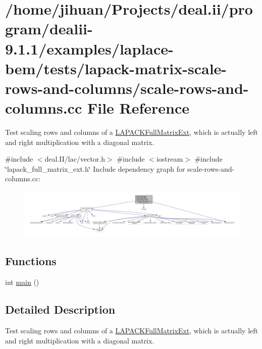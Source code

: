 \hypertarget{scale-rows-and-columns_8cc}{}\section{/home/jihuan/\+Projects/deal.ii/program/dealii-\/9.1.1/examples/laplace-\/bem/tests/lapack-\/matrix-\/scale-\/rows-\/and-\/columns/scale-\/rows-\/and-\/columns.cc File Reference}
\label{scale-rows-and-columns_8cc}


Test scaling rows and columns of a \hyperlink{classLAPACKFullMatrixExt}{L\+A\+P\+A\+C\+K\+Full\+Matrix\+Ext}, which is actually left and right multiplication with a diagonal matrix.  


{\ttfamily \#include $<$deal.\+I\+I/lac/vector.\+h$>$}\newline
{\ttfamily \#include $<$iostream$>$}\newline
{\ttfamily \#include \char`\"{}lapack\+\_\+full\+\_\+matrix\+\_\+ext.\+h\char`\"{}}\newline
Include dependency graph for scale-\/rows-\/and-\/columns.cc\+:
\nopagebreak
\begin{figure}[H]
\begin{center}
\leavevmode
\includegraphics[width=350pt]{scale-rows-and-columns_8cc__incl}
\end{center}
\end{figure}
\subsection*{Functions}
\begin{DoxyCompactItemize}
\item 
int \hyperlink{scale-rows-and-columns_8cc_ae66f6b31b5ad750f1fe042a706a4e3d4}{main} ()
\end{DoxyCompactItemize}


\subsection{Detailed Description}
Test scaling rows and columns of a \hyperlink{classLAPACKFullMatrixExt}{L\+A\+P\+A\+C\+K\+Full\+Matrix\+Ext}, which is actually left and right multiplication with a diagonal matrix. 

